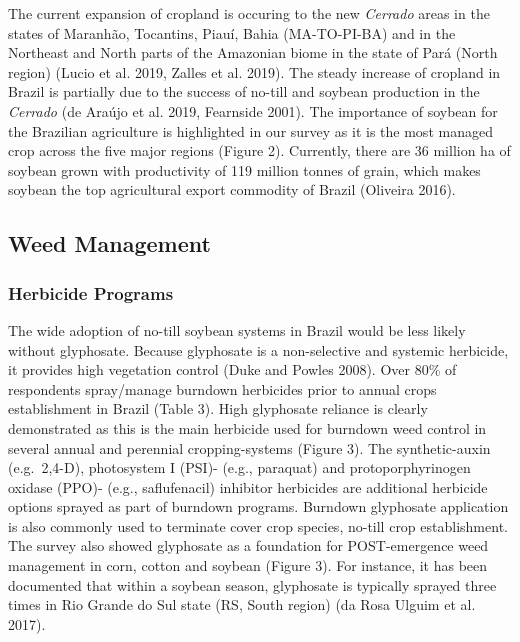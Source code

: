 \documentclass[
  12pt,
  a4paper]{article}
\begin{document}
The current expansion of cropland is occuring to the new \emph{Cerrado}
areas in the states of Maranhão, Tocantins, Piauí, Bahia (MA-TO-PI-BA)
and in the Northeast and North parts of the Amazonian biome in the state
of Pará (North region) (Lucio et al. 2019, Zalles et al. 2019). The
steady increase of cropland in Brazil is partially due to the success of
no-till and soybean production in the \emph{Cerrado} (de Araújo et al.
2019, Fearnside 2001). The importance of soybean for the Brazilian
agriculture is highlighted in our survey as it is the most managed crop
across the five major regions (Figure 2). Currently, there are 36
million ha of soybean grown with productivity of 119 million tonnes of
grain, which makes soybean the top agricultural export commodity of
Brazil (Oliveira 2016).

\hypertarget{weed-management}{%
\subsection{Weed Management}\label{weed-management}}

\hypertarget{herbicide-programs}{%
\subsubsection{Herbicide Programs}\label{herbicide-programs}}

The wide adoption of no-till soybean systems in Brazil would be less
likely without glyphosate. Because glyphosate is a non-selective and
systemic herbicide, it provides high vegetation control (Duke and Powles
2008). Over 80\% of respondents spray/manage burndown herbicides prior
to annual crops establishment in Brazil (Table 3). High glyphosate
reliance is clearly demonstrated as this is the main herbicide used for
burndown weed control in several annual and perennial cropping-systems
(Figure 3). The synthetic-auxin (e.g.~2,4-D), photosystem I (PSI)-
(e.g., paraquat) and protoporphyrinogen oxidase (PPO)- (e.g.,
saflufenacil) inhibitor herbicides are additional herbicide options
sprayed as part of burndown programs. Burndown glyphosate application is
also commonly used to terminate cover crop species, no-till crop
establishment. The survey also showed glyphosate as a foundation for
POST-emergence weed management in corn, cotton and soybean (Figure 3).
For instance, it has been documented that within a soybean season,
glyphosate is typically sprayed three times in Rio Grande do Sul state
(RS, South region) (da Rosa Ulguim et al. 2017).
\end{document}
